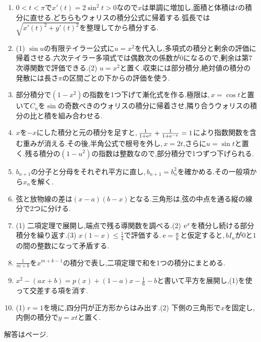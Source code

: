 \begin{enumerate}[label=\textbf{\thechapter.\arabic*},leftmargin=*]
 \item $0<t<\pi$で$x'(t)=2\sin^2t>0$なので$x$は単調に増加し,面積と体積は$t$の積分に直せる.どちらもウォリスの積分公式に帰着する.弧長では$\sqrt{x'(t)^2+y'(t)^2}$を整理してから積分する.
 \item (1) $\sin u$の有限テイラー公式に$u=x^2$を代入し,多項式の積分と剰余の評価に帰着させる.六次テイラー多項式では偶数次の係数が$0$になるので,剰余は第7次導関数で評価できる.(2) $u=x^2$と置く.収束には部分積分,絶対値の積分の発散には長さ$\pi$の区間ごとの下からの評価を使う.
 \item 部分積分で$(1-x^2)$の指数を1つ下げて漸化式を作る.極限は,\,$x=\cos t$と置いて$C_n$を$\sin$の奇数べきのウォリスの積分に帰着させ,隣り合うウォリスの積分の比と積を組み合わせる.
 \item $x$を$-x$にした積分と元の積分を足すと,\,$\frac1{1+\mathrm{e}^x}+\frac1{1+\mathrm{e}^{-x}}=1$により指数関数を含む重みが消える.その後,半角公式で根号を外し,\,$x=2t$,さらに$u=\sin t$と置く.残る積分の$(1-u^2)$の指数は整数なので,部分積分で1つずつ下げられる.

 \item $b_{n+1}$の分子と分母をそれぞれ平方に直し,\,$b_{n+1}=b_n^2$を確かめる.その一般項から$x_n$を解く.
 \item 弦と放物線の差は$(x-a)(b-x)$となる.三角形は,弦の中点を通る縦の線分で2つに分ける.
 \item (1) 二項定理で展開し,端点で残る導関数を調べる.(2) $\mathrm{e}^x$を積分し続ける部分積分を繰り返す.(3) $x(1-x)\le\frac14$で評価する.\,$\mathrm{e}=\frac ab$と仮定すると,\,$bI_n$が$0$と$1$の間の整数になって矛盾する.
 \item $\frac1{m+k}$を$x^{m+k-1}$の積分で表し,二項定理で和を1つの積分にまとめる.
 \item $x^2-(ax+b)=p(x)+(1-a)x-\frac16-b$と書いて平方を展開し,(1)を使って交差する項を消す.
 \item (1) $r=1$を境に,四分円が正方形からはみ出す.(2) 下側の三角形で$x$を固定し,内側の積分で$y=xt$と置く.
\end{enumerate}

\smallskip\noindent 解答は\pageref{解答:第13章}ページ.
